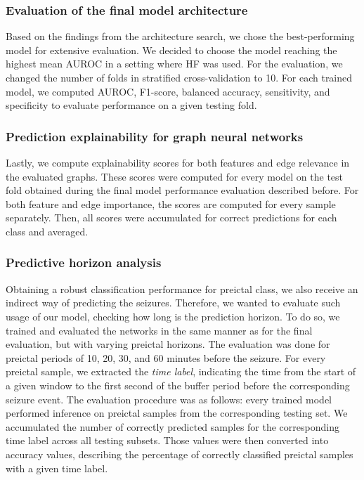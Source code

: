 \documentclass[a4paper,fleqn]{cas-sc}
\begin{document}
\subsubsection{Evaluation of the final model architecture}
Based on the findings from the architecture search, we chose the best-performing model for extensive evaluation. We decided to choose the model reaching the highest mean AUROC in a setting where HF was used. For the evaluation, we changed the number of folds in stratified cross-validation to 10. For each trained model, we computed AUROC, F1-score, balanced accuracy, sensitivity, and specificity to evaluate performance on a given testing fold.
\subsubsection{Prediction explainability for graph neural networks}
Lastly, we compute explainability scores for both features and edge relevance in the evaluated graphs. These scores were computed for every model on the test fold obtained during the final model performance evaluation described before. For both feature and edge importance, the scores are computed for every sample separately. Then, all scores were accumulated for correct predictions for each class and averaged.

\subsubsection{Predictive horizon analysis}
Obtaining a robust classification performance for preictal class, we also receive an indirect way of predicting the seizures. Therefore, we wanted to evaluate such usage of our model, checking how long is the prediction horizon. To do so, we trained and evaluated the networks in the same manner as for the final evaluation, but with varying preictal horizons. The evaluation was done for preictal periods of 10, 20, 30, and 60 minutes before the seizure. For every preictal sample, we extracted the \textit{time label}, indicating the time from the start of a given window to the first second of the buffer period before the corresponding seizure event. 
The evaluation procedure was as follows: every trained model performed inference on preictal samples from the corresponding testing set. We accumulated the number of correctly predicted samples for the corresponding time label across all testing subsets. Those values were then converted into accuracy values, describing the percentage of correctly classified preictal samples with a given time label.  
\end{document}
